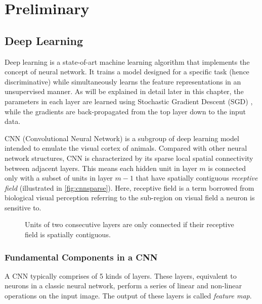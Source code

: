 
\chapter{Preliminary}
\section{Deep Learning}
Deep learning is a state-of-art machine learning algorithm that implements the concept of neural network.
It trains a model designed for a specific task (hence discriminative) while simultaneously learns the feature representations in an unsupervised manner. 
As will be explained in detail later in this chapter, the parameters in each layer are learned using Stochastic Gradient Descent (SGD) \cite{bottou2010large}, while the gradients are back-propagated from the top layer down to the input data.

CNN (Convolutional Neural Network) is a subgroup of deep learning model intended to emulate the visual cortex of animals. 
Compared with other neural network structures, CNN is characterized by its sparse local spatial connectivity between adjacent layers. 
This means each hidden unit in layer $ m $ is connected only with a subset of units in layer $ m-1 $ that have spatially contiguous \textit{receptive field}
\cite{cnnlenet} (illustrated in \autoref{fig:cnnsparse}). 
Here, receptive field is a term borrowed from biological visual perception referring to the sub-region on visual field a neuron is sensitive to.

\begin{figure}[h]
\centering
{}
\caption[Sparse connectivity in CNN]{Units of two consecutive layers are only connected if their receptive field is spatially contiguous.}\label{fig:cnnsparse}
\end{figure}
\subsection{Fundamental Components in a CNN}
A CNN typically comprises of 5 kinds of layers. These layers, equivalent to neurons in a classic neural network, perform a series of linear and non-linear operations on the input image. The output of these layers is called \textit{feature map}.

